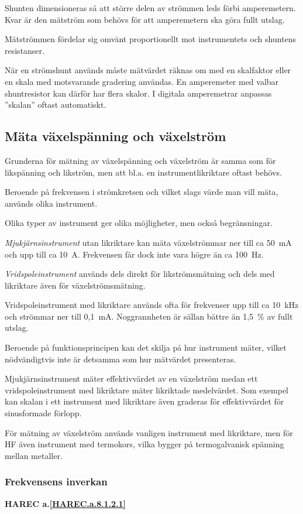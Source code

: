 Shunten dimensioneras så att större delen av strömmen leds förbi amperemetern.
Kvar är den mätström som behövs för att amperemetern ska göra fullt utslag.

Mätströmmen fördelar sig omvänt proportionellt mot instrumentets och
shuntens resistanser.

När en strömshunt används måste mätvärdet räknas om med en skalfaktor
eller en skala med motsvarande gradering användas.
En amperemeter med valbar shuntresistor kan därför har flera skalor.
I digitala amperemetrar anpassas ''skalan'' oftast automatiskt.

\subsection{Mäta växelspänning och växelström}

Grunderna för mätning av växelspänning och växelström är samma som för
likspänning och likström, men att bl.a. en instrumentlikriktare oftast behövs.

Beroende på frekvensen i strömkretsen och vilket slags värde man vill
mäta, används olika instrument.

Olika typer av instrument ger olika möjligheter, men också begränsningar.

\emph{Mjukjärnsinstrument} utan likriktare kan mäta växelströmmar ner
till ca 50~mA och upp till ca 10~A.
Frekvensen får dock inte vara högre än ca 100~Hz.

\emph{Vridspoleinstrument} används dels direkt för likströmsmätning
och dels med likriktare även för växelströmsmätning.

Vridspoleinstrument med likriktare används ofta för frekvenser upp
till ca 10~kHz och strömmar ner till 0,1~mA.
Noggrannheten är sällan bättre än 1,5~\% av fullt utslag.

Beroende på funktionsprincipen kan det skilja på hur instrument mäter,
vilket nödvändigtvis inte är detsamma som hur mätvärdet presenteras.

Mjukjärnsinstrument mäter effektivvärdet av en växelström medan ett
vridspoleinstrument med likriktare mäter likriktade medelvärdet.
Som exempel kan skalan i ett instrument med likriktare även graderas för
effektivvärdet för sinusformade förlopp.

För mätning av växelström används vanligen instrument med likriktare,
men för HF även instrument med termokors, vilka bygger på
termogalvanisk spänning mellan metaller.

\subsubsection{Frekvensens inverkan}
\textbf{
HAREC a.\ref{HAREC.a.8.1.2.1}\label{myHAREC.a.8.1.2.1}
}

